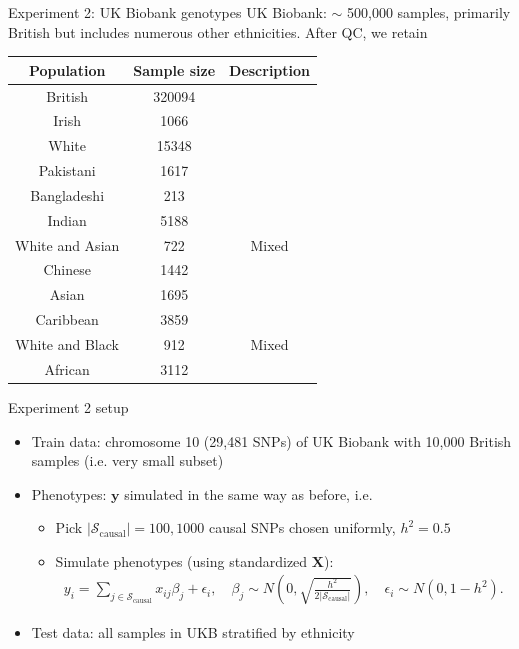\documentclass[aspectratio=169, 10pt]{beamer}
\newcommand{\by}{\boldsymbol{y}}
\newcommand{\bX}{\boldsymbol{X}}
\begin{document}
\begin{frame}{Experiment 2: UK Biobank genotypes}
    UK Biobank: $\sim$ 500,000 samples, primarily British but includes numerous other ethnicities. After QC, we retain
    \begin{table}[]
    \centering
    \small
    \begin{tabular}{c|c|c}
        Population & Sample size & Description\\
        \hline
        British & 320094 & \\
        Irish & 1066 & \\
        White & 15348 & \\
        Pakistani & 1617 & \\
        Bangladeshi & 213 & \\
        Indian  & 5188 & \\
        White and Asian & 722 & Mixed \\
        Chinese & 1442 & \\
        Asian & 1695 & \\
        Caribbean  & 3859 & \\
        White and Black & 912 & Mixed\\
        African  & 3112 & \\
    \end{tabular}
\end{table}
\end{frame}

\begin{frame}{Experiment 2 setup}
    \begin{itemize}
        \item Train data: chromosome 10 (29,481 SNPs) of UK Biobank with 10,000 British samples (i.e. very small subset)
        \item Phenotypes: $\by$ simulated in the same way as before, i.e. 
        \begin{itemize}
            \item Pick $|\mathcal{S}_{\text{causal}}|=100, 1000$ causal SNPs chosen uniformly, $h^2 = 0.5$
        \item Simulate phenotypes (using standardized $\bX$):
        \begin{align*}
            y_i = \sum_{j \in \mathcal{S}_{\text{causal}}} x_{ij}\beta_j + \epsilon_i, \quad \beta_j \sim N\left(0, \sqrt{\frac{h^2}{2|\mathcal{S}_{\text{causal}}|}}\right), \quad \epsilon_i \sim N(0, 1-h^2).
        \end{align*}
        \end{itemize}
        \item Test data: all samples in UKB stratified by ethnicity
    \end{itemize}
\end{frame}
\end{document}
